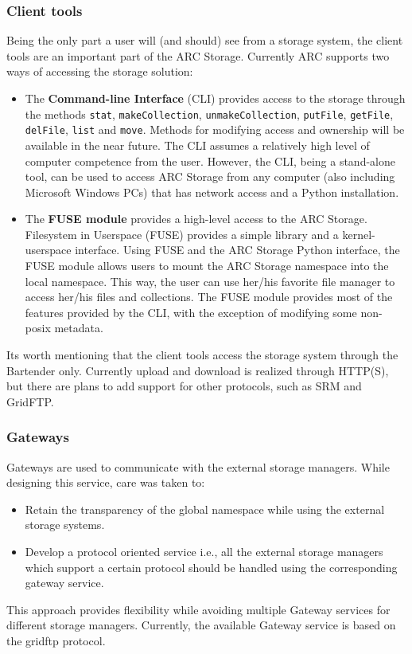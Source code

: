 \documentclass[final]{ieee}
\begin{document}
\subsubsection{Client tools }
\label{Client extension using FUSE module}

Being the only part a user will (and should) see from a storage
system, the client tools are an important part of the ARC
Storage. Currently ARC supports two ways of accessing the
storage solution:
\begin{itemize}
\item The \textbf{Command-line Interface} (CLI) provides
  access to the storage through the methods \texttt{stat}, \texttt{makeCollection},
  \texttt{unmakeCollection}, \texttt{putFile}, \texttt{getFile}, \texttt{delFile},
  \texttt{list} and \texttt{move}. Methods for modifying
  access and ownership will be available in the near future. The CLI
  assumes a relatively high level of computer competence
  from the user. However, the CLI, being a stand-alone tool, can be
  used to access ARC Storage from any computer (also including
  Microsoft Windows PCs) that has network access and
  a Python installation.
\item The \textbf{FUSE module} provides a high-level access to the
  ARC Storage. Filesystem in Userspace (FUSE) \cite{FUSE} provides a simple
  library and a kernel-userspace interface. Using FUSE and the ARC
  Storage Python interface, the FUSE module allows users to mount the
  ARC Storage namespace into the local namespace. This way, the user
  can use her/his favorite file manager to access her/his files and
  collections. The FUSE module provides most of the features provided
  by the CLI, with the exception of modifying some non-posix metadata.
\end{itemize}
Its worth mentioning that the client tools access the storage system
through the Bartender only. Currently upload and download is realized
through HTTP(S), but there are plans to add support for other
protocols, such as SRM and GridFTP.

\subsubsection{Gateways }
\label{Gateways}

Gateways are used to communicate with the external storage
managers. While designing this service, care was taken to: 
\begin{itemize}
\item Retain the transparency of the global namespace while using the external storage systems.
\item  Develop a protocol oriented  service i.e., all the external
  storage managers which support a certain protocol should be handled
  using the corresponding gateway service.  
\end{itemize}
This approach provides flexibility while avoiding multiple Gateway
services for different storage managers. Currently, the available
Gateway service is based on the gridftp protocol.  
\end{document}

